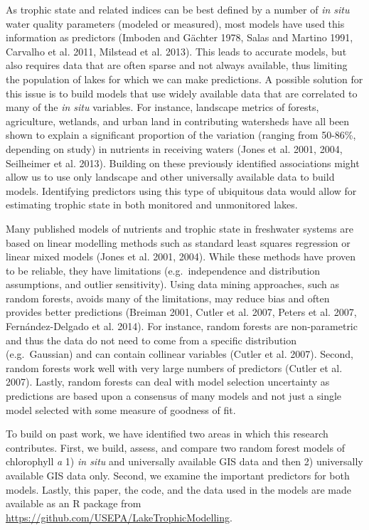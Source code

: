 \documentclass[11pt,]{article}
\begin{document}
As trophic state and related indices can be best defined by a number of
\emph{in situ} water quality parameters (modeled or measured), most
models have used this information as predictors (Imboden and G{ä}chter
1978, Salas and Martino 1991, Carvalho et al. 2011, Milstead et al.
2013). This leads to accurate models, but also requires data that are
often sparse and not always available, thus limiting the population of
lakes for which we can make predictions. A possible solution for this
issue is to build models that use widely available data that are
correlated to many of the \emph{in situ} variables. For instance,
landscape metrics of forests, agriculture, wetlands, and urban land in
contributing watersheds have all been shown to explain a significant
proportion of the variation (ranging from 50-86\%, depending on study)
in nutrients in receiving waters (Jones et al. 2001, 2004, Seilheimer et
al. 2013). Building on these previously identified associations might
allow us to use only landscape and other universally available data to
build models. Identifying predictors using this type of ubiquitous data
would allow for estimating trophic state in both monitored and
unmonitored lakes.

Many published models of nutrients and trophic state in freshwater
systems are based on linear modelling methods such as standard least
squares regression or linear mixed models (Jones et al. 2001, 2004).
While these methods have proven to be reliable, they have limitations
(e.g.~independence and distribution assumptions, and outlier
sensitivity). Using data mining approaches, such as random forests,
avoids many of the limitations, may reduce bias and often provides
better predictions (Breiman 2001, Cutler et al. 2007, Peters et al.
2007, Fernández-Delgado et al. 2014). For instance, random forests are
non-parametric and thus the data do not need to come from a specific
distribution (e.g.~Gaussian) and can contain collinear variables (Cutler
et al. 2007). Second, random forests work well with very large numbers
of predictors (Cutler et al. 2007). Lastly, random forests can deal with
model selection uncertainty as predictions are based upon a consensus of
many models and not just a single model selected with some measure of
goodness of fit.

To build on past work, we have identified two areas in which this
research contributes. First, we build, assess, and compare two random
forest models of chlorophyll \emph{a} 1) \emph{in situ} and universally
available GIS data and then 2) universally available GIS data only.
Second, we examine the important predictors for both models. Lastly,
this paper, the code, and the data used in the models are made available
as an R package from
\url{https://github.com/USEPA/LakeTrophicModelling}.
\end{document}
